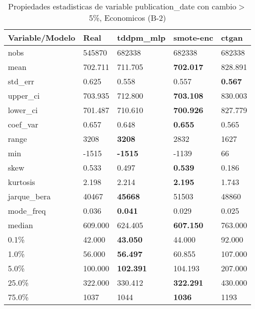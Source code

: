 \begin{table}[H]
\centering
\fontsize{8}{14}\selectfont
\caption{Propiedades estadisticas de variable publication\_date con cambio\ensuremath{>}5\%, Economicos (B-2)}
\label{table-stats-economicos-b-2-publication_date-short}
\begin{tabular}{|l|m{10em}|m{10em}|m{10em}|m{10em}|}
\hline
 \rowcolor[gray]{0.8}
Variable/Modelo & Real & tddpm\_mlp & smote-enc & ctgan \\
\hline nobs & 545870 & 682338 & 682338 & 682338 \\
\hline mean & 702.711 & 711.705 & \bfseries 702.017 & \cellcolor[rgb]{0.9, 0.54, 0.52} 828.891 \\
\hline std\_err & 0.625 & 0.558 & \cellcolor[rgb]{0.9, 0.54, 0.52} 0.557 & \bfseries 0.567 \\
\hline upper\_ci & 703.935 & 712.800 & \bfseries 703.108 & \cellcolor[rgb]{0.9, 0.54, 0.52} 830.003 \\
\hline lower\_ci & 701.487 & 710.610 & \bfseries 700.926 & \cellcolor[rgb]{0.9, 0.54, 0.52} 827.779 \\
\hline coef\_var & 0.657 & 0.648 & \bfseries 0.655 & \cellcolor[rgb]{0.9, 0.54, 0.52} 0.565 \\
\hline range & 3208 & \bfseries 3208 & 2832 & \cellcolor[rgb]{0.9, 0.54, 0.52} 1627 \\
\hline min & -1515 & \bfseries -1515 & -1139 & \cellcolor[rgb]{0.9, 0.54, 0.52} 66 \\
\hline skew & 0.533 & 0.497 & \bfseries 0.539 & \cellcolor[rgb]{0.9, 0.54, 0.52} 0.186 \\
\hline kurtosis & 2.198 & 2.214 & \bfseries 2.195 & \cellcolor[rgb]{0.9, 0.54, 0.52} 1.743 \\
\hline jarque\_bera & 40467 & \bfseries 45668 & \cellcolor[rgb]{0.9, 0.54, 0.52} 51503 & 48860 \\
\hline mode\_freq & 0.036 & \bfseries 0.041 & 0.029 & \cellcolor[rgb]{0.9, 0.54, 0.52} 0.025 \\
\hline median & 609.000 & 624.405 & \bfseries 607.150 & \cellcolor[rgb]{0.9, 0.54, 0.52} 763.000 \\
\hline 0.1\% & 42.000 & \bfseries 43.050 & 44.000 & \cellcolor[rgb]{0.9, 0.54, 0.52} 92.000 \\
\hline 1.0\% & 56.000 & \bfseries 56.497 & 60.855 & \cellcolor[rgb]{0.9, 0.54, 0.52} 107.000 \\
\hline 5.0\% & 100.000 & \bfseries 102.391 & 104.193 & \cellcolor[rgb]{0.9, 0.54, 0.52} 207.000 \\
\hline 25.0\% & 322.000 & 330.412 & \bfseries 322.291 & \cellcolor[rgb]{0.9, 0.54, 0.52} 430.000 \\
\hline 75.0\% & 1037 & 1044 & \bfseries 1036 & \cellcolor[rgb]{0.9, 0.54, 0.52} 1193 \\
\hline
\end{tabular}
\end{table}
